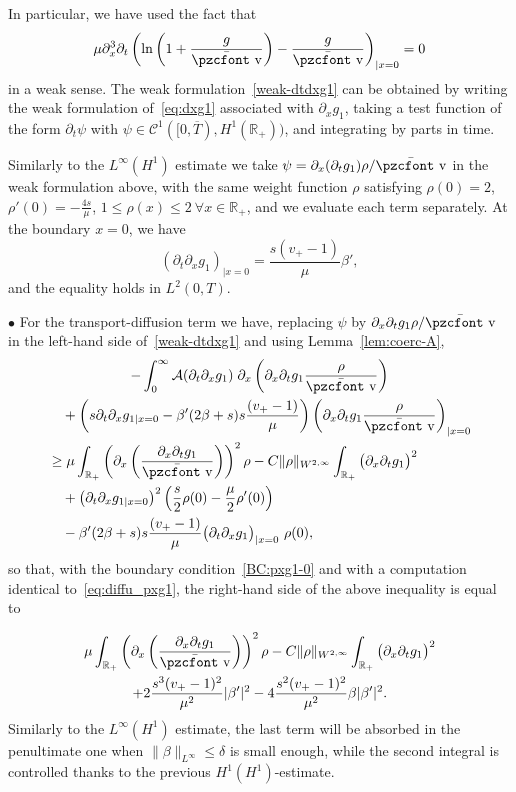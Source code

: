\documentclass[10pt]{amsart}
\theoremstyle{definition}\newtheorem{defi}[theo]{Definition}\newtheorem{rema}[theo]{Remark}\newtheorem{exam}[theo]{Example}\newtheorem{exem}[theo]{Example}\newtheorem{nota}[theo]{Notation}
\newcommand{\mathpzc}[1]{\text{\pzcfont #1}}
\newcommand{\R}{\mathbb{R}}
\newcommand{\p}{\partial}
\newcommand{\bv}{\bar{\mathpzc{v}}}
\newcommand{\cA}{\mathcal A}
\newcommand{\cC}{\mathcal C}
\let\oldforall\forall
\renewcommand*{\forall}{\mathrel{\oldforall}}
\begin{document}
In particular, we have used the fact that
\[
\mu \p_x^3\p_t \left(\ln \left(1+ \dfrac{g}{\bv}\right) - \dfrac{g}{\bv} \right)_{|x=0}=0
\]
in a weak sense. The weak formulation~\eqref{weak-dtdxg1} can be obtained by writing the weak formulation of~\eqref{eq:dxg1} associated with $\p_x g_1$, taking a test function of the form $\p_t \psi$ with $\psi \in \cC^1([0,\overline{T}), H^1(\R_+))$, and integrating by parts in time.



Similarly to the $L^\infty(H^1)$ estimate we take $\psi=\partial_x(\partial_t g_1) \rho / \bv$ in the weak formulation above, with the same weight function $\rho$ satisfying $\rho(0)=2$, $\rho'(0)=-\frac{4s}{\mu}$, $1\leq \rho(x)\leq 2~\forall x\in \R_+$, and we evaluate each term separately. At the boundary $x=0$, we have
\begin{equation}\label{BC:pxg1-0}
(\partial_t \partial_x g_1)_{|x=0} = \dfrac{s(v_+-1)}{\mu} \beta',
\end{equation}
and the equality holds in $L^2(0,T)$.


\noindent $\bullet$ For the transport-diffusion term we have, replacing $\psi$ by $\partial_x\partial_t g_1 \rho / \bv$ in the left-hand side of~\eqref{weak-dtdxg1} and using Lemma~\ref{lem:coerc-A},
\begin{multline*}
-\int_0^\infty \cA(\p_t\p_x g_1)\; \p_x \left(\partial_x\partial_t g_1 \frac{\rho}{\bv}\right) \\
\begin{aligned}
&\quad+\left(s\p_t\p_x g_{1|x=0} - \beta'(2\beta +s)s \dfrac{(v_+-1)}{\mu}\right)\left(\partial_x\partial_t g_1 \frac{\rho}{\bv}\right)_{|x=0}\\
& \geq \mu \int_{\R_+} \left(\partial_x \left(\dfrac{\partial_x \partial_t g_1}{\bv} \right) \right)^2 \rho - C \|\rho\|_{W^{2,\infty}} \int_{\R_+} \big(\partial_x \partial_t g_1\big)^2 \\
& \quad + \left(\partial_t \p_x g_{1|x=0}\right)^2 \left(\frac{s}{2} \rho(0)- \frac{\mu}{2}\rho'(0) \right)\\
& \quad - \beta'(2\beta +s)s \dfrac{(v_+-1)}{\mu} \big(\partial_t \partial_x g_1\big)_{|x=0} \ \rho(0),
\end{aligned}
\end{multline*}
so that, with the boundary condition~\eqref{BC:pxg1-0} and with a computation identical to~\eqref{eq:diffu_pxg1}, the right-hand side of the above inequality is equal to

\begin{multline*}
 \mu \int_{\R_+} \left(\partial_x \left(\dfrac{\partial_x \partial_t g_1}{\bv} \right) \right)^2 \rho - C \|\rho\|_{W^{2,\infty}} \int_{\R_+} \big(\partial_x \partial_t g_1\big)^2 \\
+ 2\dfrac{s^3 (v_+-1)^2}{\mu^2} |\beta'|^2 - 4 \dfrac{s^2(v_+-1)^2}{\mu^2} \beta |\beta'|^2.
\end{multline*}
Similarly to the $L^\infty(H^1)$ estimate, the last term will be absorbed in the penultimate one when $\|\beta\|_{L^\infty} \leq \delta$ is small enough, while the second integral is controlled thanks to the previous $H^1(H^1)$-estimate.
\end{document}
